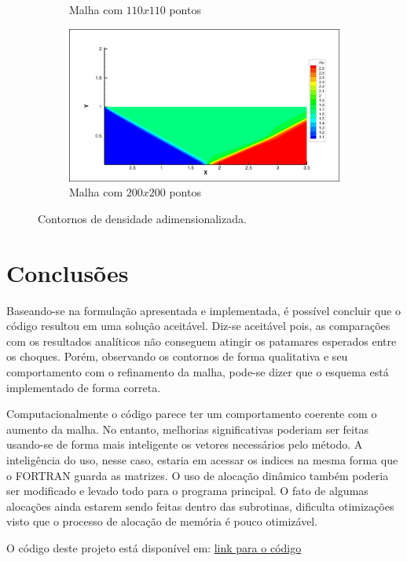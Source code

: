 \documentclass[a4paper, twoside, 12pt]{article}
\numberwithin{equation}{section}
\begin{document}
\begin{figure}[H]
\begin{subfigure}{.5\textwidth}
            \caption{Malha com $110x110$ pontos}
            \label{fig:sfig1}
            \end{subfigure}%
            \begin{subfigure}{.5\textwidth}
            \centering
            \includegraphics[width=.9\linewidth]{pics/rho_200200.png}
            \caption{Malha com $200x200$ pontos}
            \label{fig:sfig2}
            \end{subfigure}

        \caption{Contornos de densidade adimensionalizada.}
        \label{fig:fig}
        \vspace*{-5pt}
        \end{figure}


\section{Conclusões}
Baseando-se na formulação apresentada e implementada, é possível concluir que o código resultou em uma solução aceitável. Diz-se aceitável pois, as comparações com os resultados analíticos não conseguem atingir os patamares esperados entre os choques. Porém, observando os contornos de forma qualitativa e seu comportamento com o refinamento da malha, pode-se dizer que o esquema está implementado de forma correta. 

Computacionalmente o código parece ter um comportamento coerente com o aumento da malha. No entanto, melhorias significativas poderiam ser feitas usando-se de forma mais inteligente os vetores necessários pelo método. A inteligência do uso, nesse caso, estaria em acessar os indices na mesma forma que o FORTRAN guarda as matrizes. O uso de alocação dinâmico também poderia ser modificado e levado todo para o programa principal. O fato de algumas alocações ainda estarem sendo feitas dentro das subrotinas, dificulta otimizações visto que o processo de alocação de memória é pouco otimizável.

O código deste projeto está disponível em: \href{https://github.com/lmarmotta/n.cfd_oblique.shock2d}{link para o código}


\end{document}
